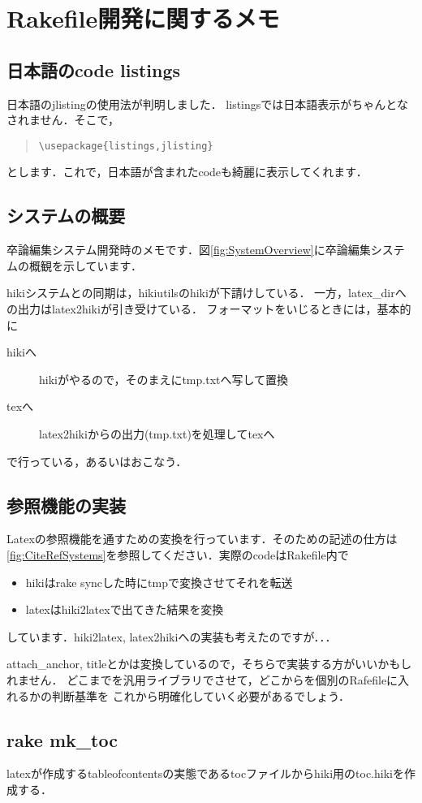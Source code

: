 \section{Rakefile開発に関するメモ}
\subsection{日本語のcode listings}
日本語のjlistingの使用法が判明しました．
listingsでは日本語表示がちゃんとなされません．そこで，
\begin{quote}\begin{verbatim}
\usepackage{listings,jlisting}
\end{verbatim}\end{quote}
とします．これで，日本語が含まれたcodeも綺麗に表示してくれます．

\subsection{システムの概要}
卒論編集システム開発時のメモです．図\ref{fig:SystemOverview}に卒論編集システムの概観を示しています．

hikiシステムとの同期は，hikiutilsのhikiが下請けしている．
一方，latex\_dirへの出力はlatex2hikiが引き受けている．
フォーマットをいじるときには，基本的に
\begin{description}
\item[hikiへ] hikiがやるので，そのまえにtmp.txtへ写して置換

\item[texへ] latex2hikiからの出力(tmp.txt)を処理してtexへ

\end{description}
で行っている，あるいはおこなう．

\subsection{参照機能の実装}
Latexの参照機能を通すための変換を行っています．そのための記述の仕方は\ref{fig:CiteRefSystems}を参照してください．実際のcodeはRakefile内で

\begin{itemize}
\item hikiはrake syncした時にtmpで変換させてそれを転送
\item latexはhiki2latexで出てきた結果を変換
\end{itemize}
しています．hiki2latex, latex2hikiへの実装も考えたのですが．．．

attach\_anchor, titleとかは変換しているので，そちらで実装する方がいいかもしれません．
どこまでを汎用ライブラリでさせて，どこからを個別のRafefileに入れるかの判断基準を
これから明確化していく必要があるでしょう．

\subsection{rake mk\_toc}
latexが作成するtableofcontentsの実態であるtocファイルからhiki用のtoc.hikiを作成する．

